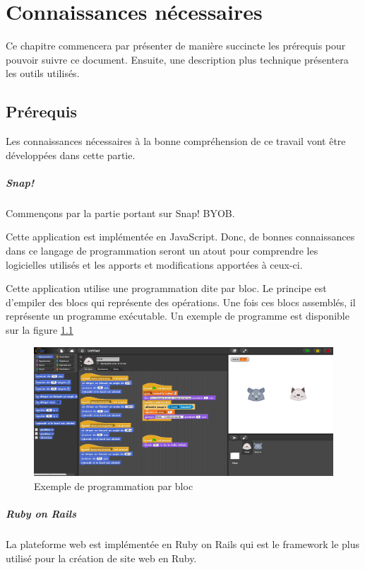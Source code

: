 \chapter{Connaissances nécessaires}
Ce chapitre commencera par présenter de manière succincte les prérequis pour pouvoir suivre ce document. Ensuite, une description plus technique présentera les outils utilisés.

\section{Prérequis}
Les connaissances nécessaires à la bonne compréhension de ce travail vont être développées dans cette partie.

\paragraph{Snap!}
Commençons par la partie portant sur Snap! BYOB. 

Cette application est implémentée en JavaScript. Donc, de bonnes connaissances dans ce langage de programmation seront un atout pour comprendre les logicielles utilisés et les apports et modifications apportées à ceux-ci.

Cette application utilise une programmation dite par bloc. Le principe est d'empiler des blocs qui représente des opérations. Une fois ces blocs assemblés, il représente un programme exécutable. Un exemple de programme est disponible sur la figure \ref{fig:prog}

\begin{figure}[]
  \begin{center}
  \includegraphics[width=\textwidth]{content/4-prerequis/images/snap}
        \caption{Exemple de programmation par bloc}
    \label{fig:prog}
  \end{center}
\end{figure}


\paragraph{Ruby on Rails}
La plateforme web est implémentée en Ruby on Rails qui est le framework le plus utilisé pour la création de site web en Ruby. 

